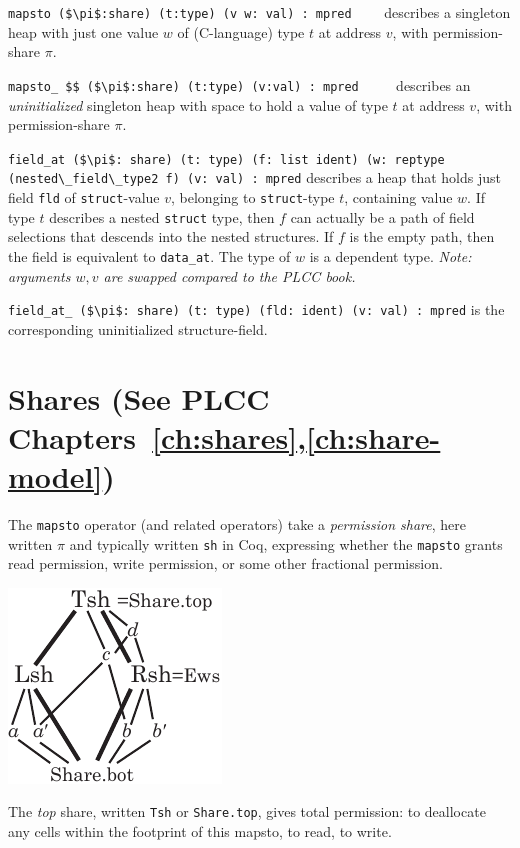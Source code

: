\documentclass[12pt,fleqn,openany,oneside,showtrims]{memoir}
\newcommand{\ychapter}[2]{\chapter[#1]{#1 \hfill \normalsize #2}}
\begin{document}
\noindent \lstinline{mapsto ($\pi$:share) (t:type) (v w: val) : mpred}
$\qquad$describes a singleton heap with
just one value $w$ of (C-language) type $t$
at address $v$, with permission-share $\pi$.

\noindent \lstinline{mapsto_ $$ ($\pi$:share) (t:type) (v:val) : mpred}
$\qquad$
describes an \emph{uninitialized} singleton heap with
space to hold a value of type $t$
at address $v$, with permission-share $\pi$.

\noindent
\lstinline{field_at ($\pi$: share) (t: type) (f: list ident) (w: reptype (nested\_field\_type2 f) (v: val) : mpred}
\newline  describes a heap
that holds just field \lstinline{fld}
of \lstinline{struct}-value $v$,
belonging to \lstinline{struct}-type $t$,
containing value $w$.
If type $t$ describes a nested \lstinline{struct} type,
then $f$ can actually be a path of field selections
that descends into the nested structures.
If $f$ is the empty path, then the field is equivalent to
\lstinline{data_at}.
The type of $w$ is a dependent type.
\emph{Note: arguments $w,v$ are swapped compared to the PLCC book.}

\lstinline{field_at_ ($\pi$: share) (t: type) (fld: ident) (v: val) : mpred}
\newline is the corresponding uninitialized structure-field.

\ychapter{Shares}{(See PLCC Chapters~\ref{ch:shares},\ref{ch:share-model})}
The \lstinline{mapsto} operator (and related operators) take a
\emph{permission share}, here written $\pi$ and typically
written \lstinline{sh} in Coq, expressing whether
the \lstinline{mapsto} grants read permission, write permission,
or some other fractional permission.

\centerline{\includegraphics[scale=1.25]{graphics/shares.pdf}}

The \emph{top} share, written \lstinline{Tsh} or
\lstinline{Share.top}, gives total permission: to deallocate any cells
within the footprint of this mapsto, to read, to write.
\end{document}
